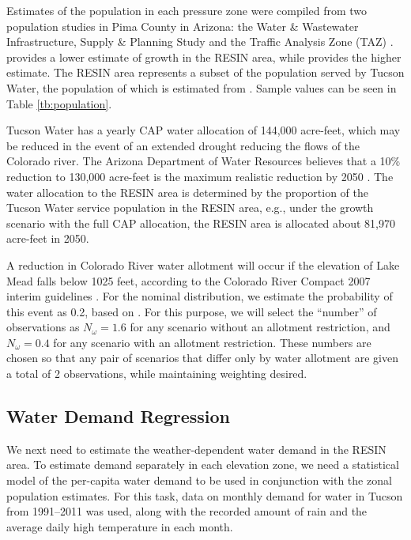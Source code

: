 \documentclass[opre,nonblindrev]{informs3} %
\begin{document}
Estimates of the population in each pressure zone were compiled from two population studies in Pima County in Arizona: the Water \& Wastewater Infrastructure, Supply \& Planning Study \citep{wisp} and the Traffic Analysis Zone (TAZ) \citep{taz}.
\cite{taz} provides a lower estimate of growth in the RESIN area, while \cite{wisp} provides the higher estimate.
The RESIN area represents a subset of the population served by Tucson Water, the population of which is estimated from \cite{tucson}.
Sample values can be seen in Table \ref{tb:population}.

Tucson Water has a yearly CAP water allocation of 144,000 acre-feet, which may be reduced in the event of an extended drought reducing the flows of the Colorado river.
The Arizona Department of Water Resources believes that a 10\% reduction to 130,000 acre-feet is the maximum realistic reduction by 2050 \citep{scott2012scenario}.
The water allocation to the RESIN area is determined by the proportion of the Tucson Water service population in the RESIN area, e.g., under the \cite{wisp} growth scenario with the full CAP allocation, the RESIN area is allocated about 81,970 acre-feet in 2050.

A reduction in Colorado River water allotment will occur if the elevation of Lake Mead falls below 1025 feet, according to the Colorado River Compact 2007 interim guidelines \citep{???}.
For the nominal distribution, we estimate the probability of this event as 0.2, based on \citep{usbor}.
For this purpose, we will select the ``number'' of observations as $N_\omega = 1.6$ for any scenario without an allotment restriction, and $N_\omega = 0.4$ for any scenario with an allotment restriction.
These numbers are chosen so that any pair of scenarios that differ only by water allotment are given a total of 2 observations, while maintaining weighting desired.


\subsection{Water Demand Regression}
\label{ssec:demand_regression}

We next need to estimate the weather-dependent water demand in the RESIN area.
To estimate demand separately in each elevation zone, we need a statistical model of the per-capita water demand to be used in conjunction with the zonal population estimates.
For this task, data on monthly demand for water in Tucson from 1991--2011 was used, along with the recorded amount of rain and the average daily high temperature in each month.
\end{document}
